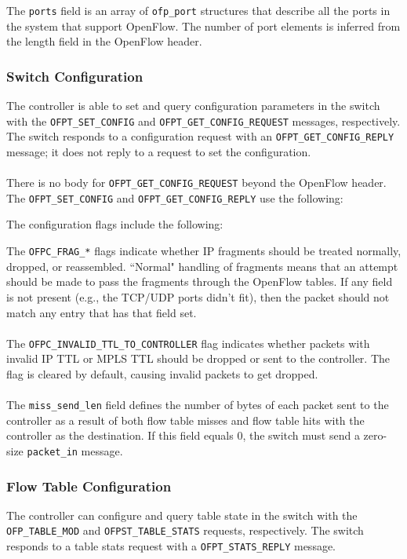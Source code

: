 The \verb|ports| field is an array of \verb|ofp_port| structures that describe all the ports in the system that support OpenFlow.  The number of port elements is inferred from the length field in the OpenFlow header. 

\subsubsection{Switch Configuration}
\label{sec:switch_config}
The controller is able to set and query configuration parameters in the switch with the \verb|OFPT_SET_CONFIG| and \verb|OFPT_GET_CONFIG_REQUEST| messages, respectively.  The switch responds to a configuration request with an \verb|OFPT_GET_CONFIG_REPLY| message; it does not reply to a request to set the configuration.  
\\\\
There is no body for \verb|OFPT_GET_CONFIG_REQUEST| beyond the OpenFlow header.  The \verb|OFPT_SET_CONFIG| and \verb|OFPT_GET_CONFIG_REPLY| use the following:


The configuration flags include the following:


The \verb|OFPC_FRAG_*| flags indicate whether IP fragments should be treated normally, dropped, or reassembled.  ``Normal" handling of fragments means that an attempt should be made to pass the fragments through the OpenFlow tables. If any field is not present (e.g., the TCP/UDP ports didn't fit), then the packet should not match any entry that has that field set.
\\\\
The \verb|OFPC_INVALID_TTL_TO_CONTROLLER| flag indicates whether packets with invalid IP TTL or MPLS TTL should be dropped or sent to the controller.  The flag is cleared by default, causing invalid packets to get dropped.
\\\\
The \verb|miss_send_len| field defines the number of bytes of each packet sent to the controller as a result of both flow table misses and flow table hits with the controller as the destination.  If this field equals 0, the switch must send a zero-size \verb|packet_in| message.

\subsubsection{Flow Table Configuration}
The controller can configure and query table state in the switch with the \verb|OFP_TABLE_MOD| and \verb|OFPST_TABLE_STATS| requests, respectively. The switch responds to a table stats request with a \verb|OFPT_STATS_REPLY| message.

